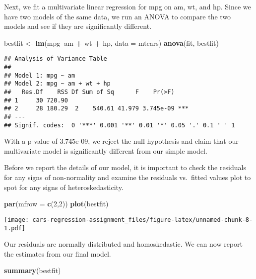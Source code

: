 \documentclass[]{article}
\newenvironment{Shaded}{\begin{snugshade}}{\end{snugshade}}
\newcommand{\KeywordTok}[1]{\textcolor[rgb]{0.13,0.29,0.53}{\textbf{#1}}}
\newcommand{\DataTypeTok}[1]{\textcolor[rgb]{0.13,0.29,0.53}{#1}}
\newcommand{\DecValTok}[1]{\textcolor[rgb]{0.00,0.00,0.81}{#1}}
\newcommand{\StringTok}[1]{\textcolor[rgb]{0.31,0.60,0.02}{#1}}
\newcommand{\OperatorTok}[1]{\textcolor[rgb]{0.81,0.36,0.00}{\textbf{#1}}}
\newcommand{\NormalTok}[1]{#1}
\begin{document}
Next, we fit a multivariate linear regression for mpg on am, wt, and hp.
Since we have two models of the same data, we run an ANOVA to compare
the two models and see if they are significantly different.

\begin{Shaded}
\begin{Highlighting}[]
\NormalTok{bestfit <-}\StringTok{ }\KeywordTok{lm}\NormalTok{(mpg}\OperatorTok{~}\NormalTok{am }\OperatorTok{+}\StringTok{ }\NormalTok{wt }\OperatorTok{+}\StringTok{ }\NormalTok{hp, }\DataTypeTok{data =}\NormalTok{ mtcars)}
\KeywordTok{anova}\NormalTok{(fit, bestfit)}
\end{Highlighting}
\end{Shaded}

\begin{verbatim}
## Analysis of Variance Table
## 
## Model 1: mpg ~ am
## Model 2: mpg ~ am + wt + hp
##   Res.Df    RSS Df Sum of Sq      F    Pr(>F)    
## 1     30 720.90                                  
## 2     28 180.29  2    540.61 41.979 3.745e-09 ***
## ---
## Signif. codes:  0 '***' 0.001 '**' 0.01 '*' 0.05 '.' 0.1 ' ' 1
\end{verbatim}

With a p-value of 3.745e-09, we reject the null hypothesis and claim
that our multivariate model is significantly different from our simple
model.

Before we report the details of our model, it is important to check the
residuals for any signs of non-normality and examine the residuals
vs.~fitted values plot to spot for any signs of heteroskedasticity.

\begin{Shaded}
\begin{Highlighting}[]
\KeywordTok{par}\NormalTok{(}\DataTypeTok{mfrow =} \KeywordTok{c}\NormalTok{(}\DecValTok{2}\NormalTok{,}\DecValTok{2}\NormalTok{))}
\KeywordTok{plot}\NormalTok{(bestfit)}
\end{Highlighting}
\end{Shaded}

\texttt{[image: cars-regression-assignment\_files/figure-latex/unnamed-chunk-8-1.pdf]}

Our residuals are normally distributed and homoskedastic. We can now
report the estimates from our final model.

\begin{Shaded}
\begin{Highlighting}[]
\KeywordTok{summary}\NormalTok{(bestfit)}
\end{Highlighting}
\end{Shaded}
\end{document}

